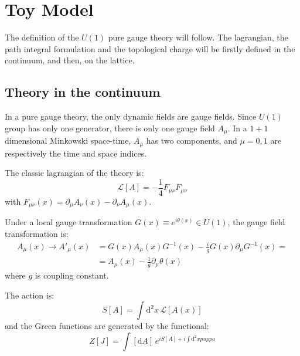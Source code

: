 \chapter{Toy Model}\label{ch:toy_model}

The definition of the $U(1)$ pure gauge theory will follow.
The lagrangian, the path integral formulation and the topological charge will be firstly defined in the continuum, and then, on the lattice.

\section{Theory in the continuum}

In a pure gauge theory, the only dynamic fields are gauge fields.
Since $U(1)$ group has only one generator, there is only one gauge field $A_\mu$.
In a $1+1$ dimensional Minkowski space-time, $A_\mu$ has two components, and $\mu = 0, 1$ are respectively the time and space indices.

The classic lagrangian of the theory is:
\[
    \mathcal L[A] = -\frac{1}{4} F_{\mu\nu}F_{\mu\nu}
\]
with $F_{\mu\nu}(x) = \partial_\mu A_\nu(x) - \partial_\nu A_\mu(x)$.

Under a local gauge transformation $G(x) \equiv e^{i\theta(x)} \in U(1)$,
the gauge field transformation is:
\begin{align*}
    A_\mu(x) \rightarrow A'_\mu(x) &= G(x) A_\mu(x) G^{-1}(x) - \frac{i}{g} G(x) \partial_\mu G^{-1}(x) = \\
                                   &= A_\mu(x) - \frac{1}{g} \partial_\mu \theta(x)
\end{align*}
where $g$ is coupling constant.

The action is:
\[
    S[A] = \int \mathrm d^2x\, \mathcal L[A(x)]
\]
and the Green functions are generated by the functional:
\[
    Z[J] = \int [\mathrm{d}A]\, e^{iS[A] + i\int\mathrm d^2x puppa}
\]


